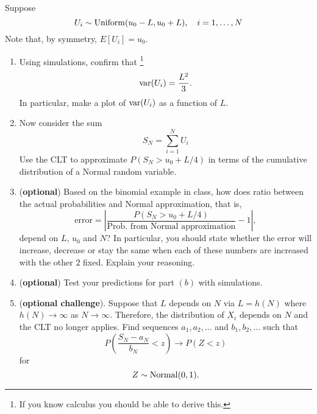 \begin{exercise}
Suppose 
\begin{equation*}
U_i \sim {\rm Uniform}(u_0-L,u_0+L),\quad i=1,\dots,N
\end{equation*}
Note that, by symmetry, $E[U_i]=u_0$. 
\begin{enumerate}[label=(\alph*)]
\item Using simulations, confirm that \footnote{If you know calculus you should be able to derive this. }
\begin{equation*}
{\rm var}(U_i) = \frac{L^2}{3}.
\end{equation*}
In particular, make a plot of ${\rm var}(U_i)$ as a function of $L$. 
\item Now consider the sum 
\begin{equation*}
S_N = \sum_{i=1}^N U_i
\end{equation*}
Use the CLT to approximate $P(S_N>u_0+L/4)$ in terms of the cumulative distribution of a Normal random variable. 
\item ({\bf optional})  Based on the binomial example in class, how does ratio between the actual probabilities and Normal approximation, that is, 
\begin{equation*}
\text{error} = \left|\frac{P(S_N>u_0+L/4)}{\text{Prob. from Normal approximation}}-1\right|,
\end{equation*}
depend on $L$, $u_0$ and $N$? In particular, you should state whether the error will increase, decrease or stay the same when each of these numbers are increased with the other $2$ fixed. Explain your reasoning.
\item ({\bf optional}) Test your predictions for part $(b)$ with simulations. 
\item ({\bf optional challenge}). Suppose that $L$ depends on $N$ via $L = h(N)$ where $h(N) \to \infty$ as $N \to \infty$. Therefore, the distribution of $X_i$ depends on $N$ and the CLT no longer applies. Find sequences $a_1,a_2,\dots$ and $b_1,b_2,\dots$ such that 
\begin{equation*}
P\left( \frac{S_N - a_N}{b_N}<z\right) \to P(Z<z)
\end{equation*}
for 
\begin{equation*}
Z \sim {\rm Normal}(0,1).
\end{equation*}
\end{enumerate}

\end{exercise}


